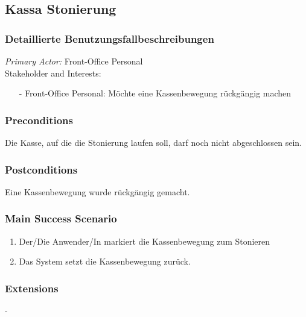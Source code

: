 \documentclass[./detailed_overview_usecases.tex]{subfiles}
\begin{document}
    \subsection{Kassa Stonierung}
    \subsubsection{Detaillierte Benutzungsfallbeschreibungen}
    \textit{Primary Actor:}
    Front-Office Personal
    \\
    Stakeholder and Interests:
    \begin{itemize}
        \item[-] Front-Office Personal: Möchte eine Kassenbewegung rückgängig machen
    \end{itemize}

    \subsubsection*{Preconditions}
    Die Kasse, auf die die Stonierung laufen soll, darf noch nicht abgeschlossen sein.

    \subsubsection*{Postconditions}
    Eine Kassenbewegung wurde rückgängig gemacht.

    \subsubsection*{Main Success Scenario}
    \begin{enumerate}
        \item Der/Die Anwender/In markiert die Kassenbewegung zum Stonieren
        \item Das System setzt die Kassenbewegung zurück.
    \end{enumerate}

    \subsubsection*{Extensions}
    -
\end{document}
